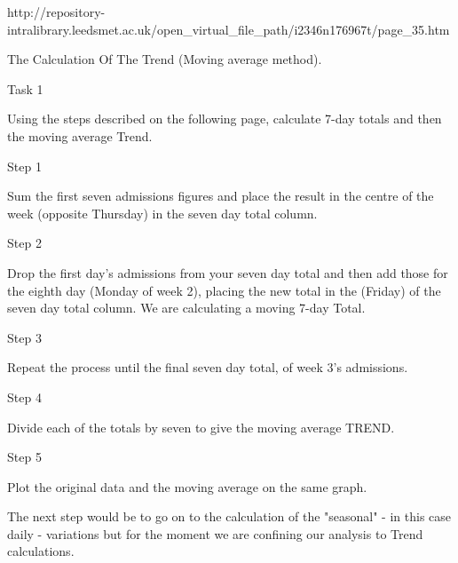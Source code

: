http://repository-intralibrary.leedsmet.ac.uk/open_virtual_file_path/i2346n176967t/page_35.htm

The Calculation Of The Trend (Moving average method).

Task 1

Using the steps described on the following page, calculate 7-day totals and then the moving average Trend.

Step 1

Sum the first seven admissions figures and place the result in the centre of the week (opposite Thursday) in the seven day total column.

Step 2

Drop the first day's admissions from your seven day total and then add those for the eighth day (Monday of week 2), placing the new total in the (Friday) of the seven day total column. We are calculating a moving 7-day Total.

Step 3

Repeat the process until the final seven day total, of week 3's admissions.

Step 4

Divide each of the totals by seven to give the moving average TREND.

Step 5

Plot the original data and the moving average on the same graph.

The next step would be to go on to the calculation of the "seasonal" - in this case daily - variations but for the moment we are confining our analysis to Trend calculations.

